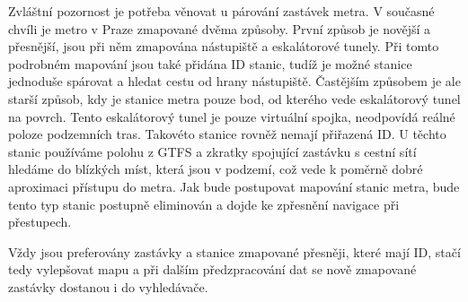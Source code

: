 Zvláštní pozornost je potřeba věnovat u párování zastávek metra. V současné
chvíli je metro v Praze zmapované dvěma způsoby. První způsob je novější a
přesnější, jsou při něm zmapována nástupiště a eskalátorové tunely. Při tomto
podrobném mapování jsou také přidána ID stanic, tudíž je možné stanice jednoduše
spárovat a hledat cestu od hrany nástupiště. Častějším způsobem je ale starší
způsob, kdy je stanice metra pouze bod, od kterého vede eskalátorový tunel na
povrch. Tento eskalátorový tunel je pouze virtuální spojka, neodpovídá reálné
poloze podzemních tras. Takovéto stanice rovněž nemají přiřazená ID. U těchto
stanic používáme polohu z GTFS a zkratky spojující zastávku s cestní sítí
hledáme do blízkých míst, která jsou v podzemí, což vede k poměrně dobré
aproximaci přístupu do metra. Jak bude postupovat mapování stanic metra, bude
tento typ stanic postupně eliminován a dojde ke zpřesnění navigace při
přestupech.

Vždy jsou preferovány zastávky a stanice zmapované přesněji, které mají ID,
stačí tedy vylepšovat mapu a při dalším předzpracování dat se nově zmapované
zastávky dostanou i do vyhledávače.


